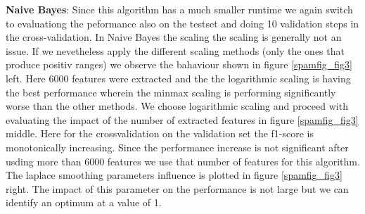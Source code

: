 \documentclass[11pt]{article}
\begin{document}
\textbf{Naive Bayes}:
Since this algorithm has a much smaller runtime we again switch to evaluationg the peformance also on the testset and doing 10 validation steps in the cross-validation. In Naive Bayes the scaling the scaling is generally not an issue. If we nevetheless apply the different scaling methods (only the ones that produce positiv ranges) we observe the bahaviour shown in figure \ref{spamfig_fig3} left. Here 6000 features were extracted and the the logarithmic scaling is having the best performance wherein the minmax scaling is performing significantly worse than the other methods. We choose logarithmic scaling and proceed with evaluating the impact of the number of extracted features in figure \ref{spamfig_fig3}  middle. Here for the crossvalidation on the validation set the f1-score is monotonically increasing. Since the performance increase is not significant after usding more than 6000 features we use that number of features for this algorithm. The laplace smoothing parameters influence is plotted in figure \ref{spamfig_fig3} right. The impact of this parameter on the performance is not large but we can identify an optimum at a value of 1.
\end{document}
